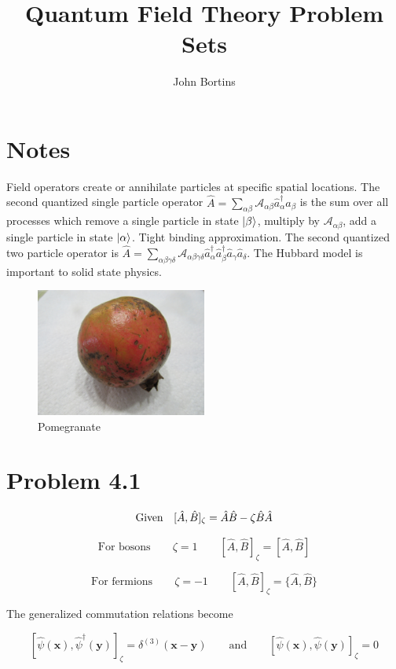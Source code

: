 \documentclass{amsart}
\title{Quantum Field Theory Problem Sets}
\author{John Bortins}
\begin{document}
 
\maketitle{}


\section*{Notes}
Field operators create or annihilate particles at specific spatial locations. The second quantized single particle operator $\hat{A}=\sum_{\alpha\beta} \mathcal{A}_{\alpha\beta}\hat{a}^\dagger_\alpha \hat{a}_\beta $ is the sum over all processes which remove a single particle in state $\ket{\beta}$, multiply by $\mathcal{A}_{\alpha\beta}$, add a single particle in state $\ket{\alpha}$. Tight binding approximation. The second quantized two particle operator is $\hat{A}=\sum_{\alpha\beta\gamma\delta} \mathcal{A}_{\alpha\beta\gamma\delta}\hat{a}^\dagger_\alpha\hat{a}^\dagger_\beta \hat{a}_\gamma\hat{a}_\delta $. The Hubbard model is important to solid state physics.

\begin{figure}[H]
    \centering
    \includegraphics[width=0.5\textwidth]{IMG_0873}
    \caption{Pomegranate}
    \label{fig:awesome_image}
\end{figure}

\section*{Problem 4.1}
 
\[\qq*{Given} [\hat{A},\hat{B}]_{\zeta} = \hat{A}\hat{B}-\zeta\hat{B}\hat{A}\]

\[\text{For bosons}\qquad \zeta=1 \qquad[\hat{A},\hat{B}]_{\zeta} = [\hat{A},\hat{B}]\]

\[\text{For fermions}\qquad \zeta=-1 \qquad[\hat{A},\hat{B}]_{\zeta} = \{\hat{A},\hat{B}\}\]

The generalized commutation relations become

\[ [\hat{\psi}(\boldsymbol{x}),\hat{\psi}^\dagger(\boldsymbol{y})]_{\zeta} =\delta^{(3)}(\boldsymbol{x}-\boldsymbol{y})  \qquad\text{and}\qquad[\hat{\psi}(\boldsymbol{x}),\hat{\psi}(\boldsymbol{y})]_{\zeta} =0\]
\end{document}
